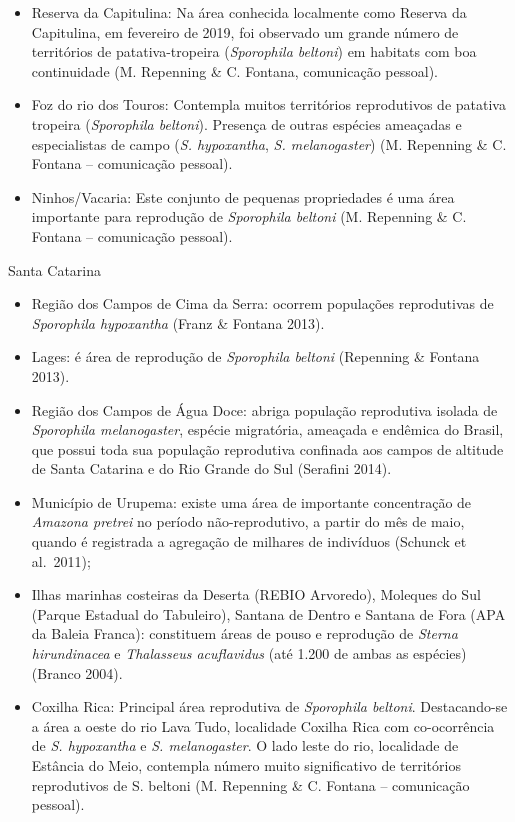 \documentclass[
  oneside]{scrbook}
\begin{document}
\begin{itemize}
\item
  Reserva da Capitulina: Na área conhecida localmente como Reserva da Capitulina, em fevereiro de 2019, foi observado um grande número de territórios de patativa-tropeira (\emph{Sporophila beltoni}) em habitats com boa continuidade (M. Repenning \& C. Fontana, comunicação pessoal).
\item
  Foz do rio dos Touros: Contempla muitos territórios reprodutivos de patativa tropeira (\emph{Sporophila beltoni}). Presença de outras espécies ameaçadas e especialistas de campo (\emph{S. hypoxantha}, \emph{S. melanogaster}) (M. Repenning \& C. Fontana -- comunicação pessoal).
\item
  Ninhos/Vacaria: Este conjunto de pequenas propriedades é uma área importante para reprodução de \emph{Sporophila beltoni} (M. Repenning \& C. Fontana -- comunicação pessoal).
\end{itemize}

Santa Catarina

\begin{itemize}
\item
  Região dos Campos de Cima da Serra: ocorrem populações reprodutivas de \emph{Sporophila hypoxantha} (Franz \& Fontana 2013).
\item
  Lages: é área de reprodução de \emph{Sporophila beltoni} (Repenning \& Fontana 2013).
\item
  Região dos Campos de Água Doce: abriga população reprodutiva isolada de \emph{Sporophila melanogaster}, espécie migratória, ameaçada e endêmica do Brasil, que possui toda sua população reprodutiva confinada aos campos de altitude de Santa Catarina e do Rio Grande do Sul (Serafini 2014).
\item
  Município de Urupema: existe uma área de importante concentração de \emph{Amazona pretrei} no período não-reprodutivo, a partir do mês de maio, quando é registrada a agregação de milhares de indivíduos (Schunck et al.~2011);
\item
  Ilhas marinhas costeiras da Deserta (REBIO Arvoredo), Moleques do Sul (Parque Estadual do Tabuleiro), Santana de Dentro e Santana de Fora (APA da Baleia Franca): constituem áreas de pouso e reprodução de \emph{Sterna hirundinacea} e \emph{Thalasseus acuflavidus} (até 1.200 de ambas as espécies) (Branco 2004).
\item
  Coxilha Rica: Principal área reprodutiva de \emph{Sporophila beltoni}. Destacando-se a área a oeste do rio Lava Tudo, localidade Coxilha Rica com co-ocorrência de \emph{S. hypoxantha} e \emph{S. melanogaster}. O lado leste do rio, localidade de Estância do Meio, contempla número muito significativo de territórios reprodutivos de S. beltoni (M. Repenning \& C. Fontana -- comunicação pessoal).
\end{itemize}
\end{document}
